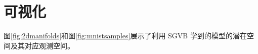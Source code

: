 \section{可视化}
\label{ap:visualisations}
图\ref{fig:2dmanifolds}和图\ref{fig:mnistsamples}展示了利用 SGVB 学到的模型的潜在空间及其对应观测空间。
